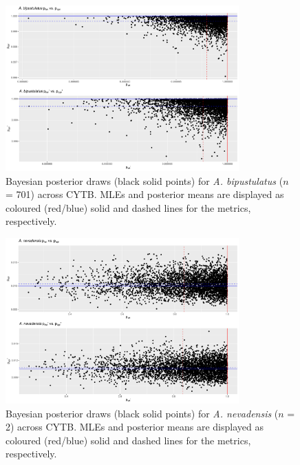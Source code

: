 \documentclass[12pt]{article}
\begin{document}
\begin{figure}[H]

\centering

\includegraphics[width=0.80\textwidth]{Figure 3}

\caption{Bayesian posterior draws (black solid points) for \textit{A. bipustulatus} ($n$ = 701) across CYTB. MLEs and posterior means are displayed as coloured (red/blue) solid and dashed lines for the metrics, respectively.}

\end{figure}


\begin{figure}[H]

\centering

\includegraphics[width=0.80\textwidth]{Figure 4}

\caption{Bayesian posterior draws (black solid points) for \textit{A. nevadensis} ($n$ = 2) across CYTB. MLEs and posterior means are displayed as coloured (red/blue) solid and dashed lines for the metrics, respectively.}

\end{figure}
\end{document}
